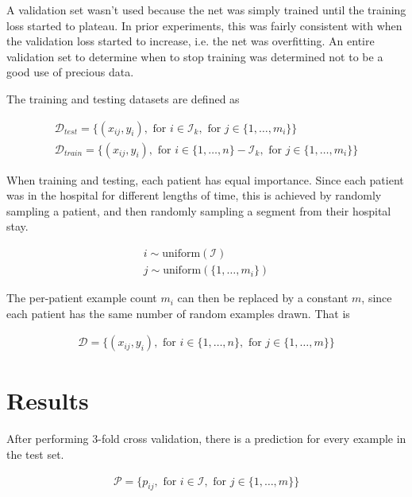 A validation set wasn't used because the net was simply trained until the training loss started to plateau.  In prior experiments, this was fairly consistent with when the validation loss started to increase, i.e. the net was overfitting.  An entire validation set to determine when to stop training was determined not to be a good use of precious data.  

The training and testing datasets are defined as

\begin{gather}
    \mathcal{D}_{test} = \{
        (x_{ij}, y_i),
        \text{ for } i \in \mathcal{I}_k,
        \text{ for } j \in \{ 1, \dots, m_i \}
    \} \\
    \mathcal{D}_{train} = \{
        (x_{ij}, y_i),
        \text{ for } i \in \{1, \dots, n\} - \mathcal{I}_k,
        \text{ for } j \in \{ 1, \dots, m_i \}
    \}
\end{gather}

When training and testing, each patient has equal importance.  Since each patient was in the hospital for different lengths of time, this is achieved by randomly sampling a patient, and then randomly sampling a segment from their hospital stay.

\begin{gather}
    i \sim \text{uniform}(\mathcal{I}) \\
    j \sim \text{uniform}(\{1, \dots, m_i\})
\end{gather}

The per-patient example count $m_i$ can then be replaced by a constant $m$, since each patient has the same number of random examples drawn.  That is

\begin{gather}
    \mathcal{D} = \{
        (x_{ij}, y_i),
        \text{ for } i \in \{ 1, \dots, n \},
        \text{ for } j \in \{ 1, \dots, m \}
    \}
\end{gather}


\section{Results}

After performing 3-fold cross validation, there is a prediction for every example in the test set.

\begin{gather}
    \mathcal{P} = \{
        p_{ij},
        \text{ for } i \in \mathcal{I},
        \text{ for } j \in \{ 1, \dots, m \}
    \}
\end{gather}

